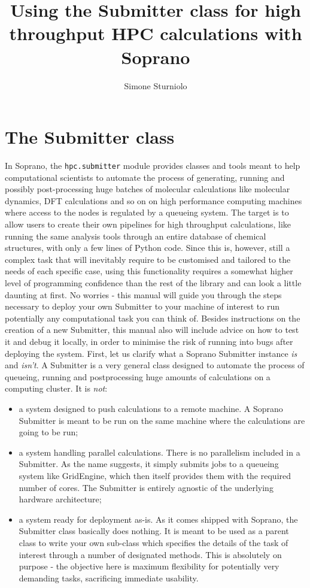 \documentclass[]{report}
\title{Using the Submitter class for high throughput HPC calculations with Soprano}
\author{Simone Sturniolo}
\begin{document}
\maketitle

\chapter{The Submitter class}

In Soprano, the \lstinline|hpc.submitter| module provides classes and tools meant to help computational scientists to automate the process of generating, running and possibly post-processing huge batches of molecular calculations like molecular dynamics, DFT calculations and so on on high performance computing machines where access to the nodes is regulated by a queueing system. The target is to allow users to create their own pipelines for high throughput calculations, like running the same analysis tools through an entire database of chemical structures, with only a few lines of Python code. Since this is, however, still a complex task that will inevitably require to be customised and tailored to the needs of each specific case, using this functionality requires a somewhat higher level of programming confidence than the rest of the library and can look a little daunting at first. No worries - this manual will guide you through the steps necessary to deploy your own Submitter to your machine of interest to run potentially any computational task you can think of. Besides instructions on the creation of a new Submitter, this manual also will include advice on how to test it and debug it locally, in order to minimise the risk of running into bugs after deploying the system.\newline
First, let us clarify what a Soprano Submitter instance \textit{is} and \textit{isn't}. A Submitter is a very general class designed to automate the process of queueing, running and postprocessing huge amounts of calculations on a computing cluster. It is \textit{not}:
\begin{itemize}
	\item a system designed to push calculations to a remote machine. A Soprano Submitter is meant to be run on the same machine where the calculations are going to be run;
	\item a system handling parallel calculations. There is no parallelism included in a Submitter. As the name suggests, it simply submits jobs to a queueing system like GridEngine, which then itself provides them with the required number of cores. The Submitter is entirely agnostic of the underlying hardware architecture; 
	\item a system ready for deployment as-is. As it comes shipped with Soprano, the Submitter class basically does nothing. It is meant to be used as a parent class to write your own sub-class which specifies the details of the task of interest through a number of designated methods. This is absolutely on purpose - the objective here is maximum flexibility for potentially very demanding tasks, sacrificing immediate usability.
\end{itemize}
\end{document}
